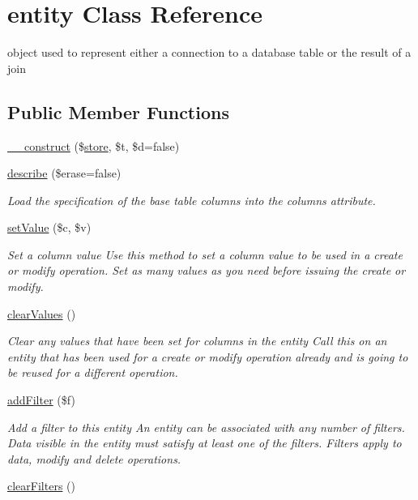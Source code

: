 \hypertarget{classentity}{\section{entity Class Reference}
\label{classentity}
}


object used to represent either a connection to a database table or the result of a join  


\subsection*{Public Member Functions}
\begin{DoxyCompactItemize}
\item 
\hyperlink{classentity_a2411a96bf911703bf07e8bac90ffa7f7}{\-\_\-\-\_\-construct} (\$\hyperlink{classstore}{store}, \$t, \$d=false)
\item 
\hyperlink{classentity_a3782e4d51b5f4e688676843e12450a94}{describe} (\$erase=false)
\begin{DoxyCompactList}\small\item\em Load the specification of the base table columns into the columns attribute. \end{DoxyCompactList}\item 
\hyperlink{classentity_a11cae02dda3cc8b9ad4966e33ef11a2a}{set\-Value} (\$c, \$v)
\begin{DoxyCompactList}\small\item\em Set a column value Use this method to set a column value to be used in a create or modify operation. Set as many values as you need before issuing the create or modify. \end{DoxyCompactList}\item 
\hypertarget{classentity_a7afa5fa5ccc2f9b9a0390cad59ecfede}{\hyperlink{classentity_a7afa5fa5ccc2f9b9a0390cad59ecfede}{clear\-Values} ()}\label{classentity_a7afa5fa5ccc2f9b9a0390cad59ecfede}

\begin{DoxyCompactList}\small\item\em Clear any values that have been set for columns in the entity Call this on an entity that has been used for a create or modify operation already and is going to be reused for a different operation. \end{DoxyCompactList}\item 
\hyperlink{classentity_a7041812e724f4d4e92f7350ac1ca4730}{add\-Filter} (\$f)
\begin{DoxyCompactList}\small\item\em Add a filter to this entity An entity can be associated with any number of filters. Data visible in the entity must satisfy at least one of the filters. Filters apply to data, modify and delete operations. \end{DoxyCompactList}\item 
\hypertarget{classentity_a3c82e6e7a3a2c79306206db541d2a343}{\hyperlink{classentity_a3c82e6e7a3a2c79306206db541d2a343}{clear\-Filters} ()}\label{classentity_a3c82e6e7a3a2c79306206db541d2a343}


\end{DoxyCompactItemize}
